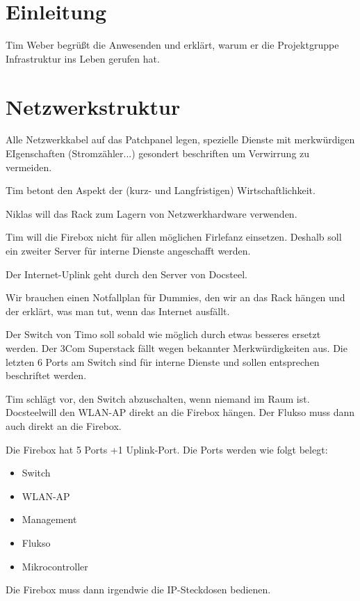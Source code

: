 \documentclass{scrartcl}
\newcommand\docsteel{Docsteel}
\begin{document}
\tableofcontents

\section{Einleitung}

Tim Weber begrüßt die Anwesenden und erklärt, warum er die Projektgruppe Infrastruktur ins Leben gerufen hat.

\section{Netzwerkstruktur}

Alle Netzwerkkabel auf das Patchpanel legen, spezielle Dienste mit merkwürdigen EIgenschaften (Stromzähler...) gesondert beschriften
um Verwirrung zu vermeiden.

Tim betont den Aspekt der (kurz- und Langfristigen) Wirtschaftlichkeit.

Niklas will das Rack zum Lagern von Netzwerkhardware verwenden.

Tim will die Firebox nicht für allen möglichen Firlefanz einsetzen.
Deshalb soll ein zweiter Server für interne Dienste angeschafft werden.

Der Internet-Uplink geht durch den Server von \docsteel.

Wir brauchen einen Notfallplan für Dummies, den wir an das Rack hängen und der erklärt, was man tut, wenn
das Internet ausfällt.

Der Switch von Timo soll sobald wie möglich durch etwas besseres ersetzt werden.
Der 3Com Superstack fällt wegen bekannter Merkwürdigkeiten aus.
Die letzten 6 Ports am Switch sind für interne Dienste und sollen entsprechen beschriftet werden.

Tim schlägt vor, den Switch abzuschalten, wenn niemand im Raum ist.
\docsteel will den WLAN-AP direkt an die Firebox hängen.
Der Flukso muss dann auch direkt an die Firebox.

Die Firebox hat 5 Ports +1 Uplink-Port. Die Ports werden wie folgt belegt:
\begin{itemize}
\item{} Switch
\item{} WLAN-AP
\item{} Management
\item{} Flukso
\item{} Mikrocontroller
\end{itemize}

Die Firebox muss dann irgendwie die IP-Steckdosen bedienen.
\end{document}
